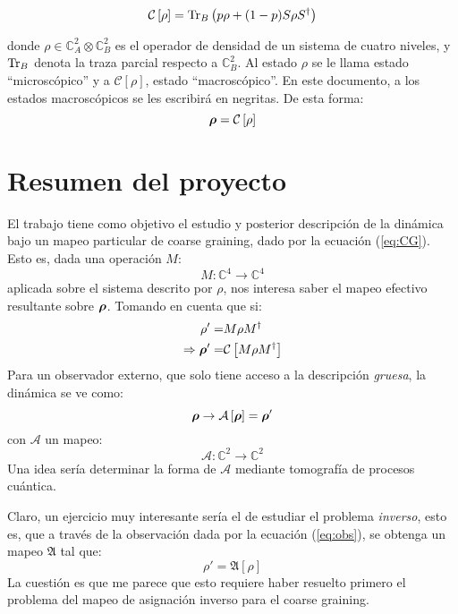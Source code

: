 \documentclass[onecolumn,11pt]{article}
\newcommand{\Cc}{\mathcal{C}} %
\newcommand{\Hh}{\mathbb{C}} %
\newcommand{\CG}[1]{\Cc\left[#1\right]}
\newcommand*{\B}[1]{\ifmmode\bm{#1}\else\textbf{#1}\fi}
\begin{document}
\begin{equation}\label{eq:CG}
    \Cc\left[\rho\right]=\Tr_{B}\left(p\rho+(1-p)S\rho S^{\dag}\right)
\end{equation}

donde $\rho\in \Hh^{2}_{A}\otimes \Hh^{2}_{B}$ es el operador de densidad de un sistema de cuatro niveles, y $\Tr_{B}$ denota la traza parcial respecto a $\Hh^{2}_{B}$. Al estado $\rho$ se le llama estado ``microscópico'' y a $\CG{\rho}$, estado ``macroscópico''. En este documento, a los estados macroscópicos se les escribirá en negritas. De esta forma:
\begin{equation}
    \B{\rho}=\CG{\rho}
\end{equation}

\vspace{0.5cm}
\section{Resumen del proyecto}

El trabajo tiene como objetivo el estudio y posterior descripción de la dinámica bajo un mapeo particular de coarse graining, dado por la ecuación (\ref{eq:CG}). Esto es, dada una operación $M$:
\begin{equation}
    M:\Hh^{4}\rightarrow\Hh^{4}
\end{equation}
aplicada sobre el sistema descrito por $\rho$, nos interesa saber el mapeo efectivo resultante sobre $\B{\rho}$. Tomando en cuenta que si:
\begin{align}
    \rho'=&M\rho M^{\dag}\\
    \Rightarrow \B{\rho}'=&\CG{M\rho M^{\dag}}
\end{align}
Para un observador externo, que solo tiene acceso a la descripción \textit{gruesa}, la dinámica se ve como:
\begin{equation}\label{eq:obs}
    \B{\rho}\rightarrow\mathcal{A}\left[\B{\rho}\right]=\B{\rho}'
\end{equation}
con $\mathcal{A}$ un mapeo:
\begin{equation}
    \mathcal{A}:\Hh^{2}\rightarrow\Hh^{2}
\end{equation}
Una idea sería determinar la forma de $\mathcal{A}$ mediante tomografía de procesos cuántica. 

Claro, un ejercicio muy interesante sería el de estudiar el problema \textit{inverso}, esto es, que a través de la observación dada por la ecuación (\ref{eq:obs}), se obtenga un mapeo $\mathfrak{A}$ tal que:
\begin{equation}
    \rho'=\mathfrak{A}\left[\rho\right]
\end{equation}
La cuestión es que me parece que esto requiere haber resuelto primero el problema del mapeo de asignación inverso para el coarse graining.
\end{document}
